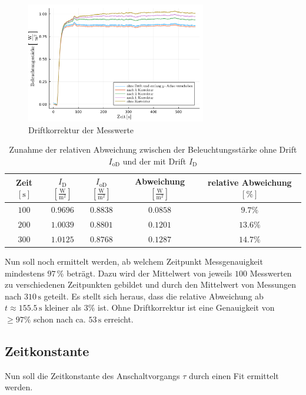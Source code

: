 \documentclass[12pt,a4paper]{scrartcl}
\numberwithin{equation}{section} %
\begin{document}
\begin{figure}[h!]
	\centering
	\includegraphics[width=0.7\textwidth]{../media/B1.1/Drift.pdf}
	\caption{Driftkorrektur der Messwerte}
	\label{abb:Driftkorrektur der Messwerte}
\end{figure}

\begin{table}[h!]
	\centering
	\begin{tabular}{c|c|c|c|c}
		Zeit $[\mathrm{s}]$
		& $I_\mathrm{D}$ $[\mathrm{\frac{W}{m^2}}]$
		& $I_\mathrm{oD}$ $[\mathrm{\frac{W}{m^2}}]$
		& Abweichung $[\mathrm{\frac{W}{m^2}}]$
		& relative Abweichung $[\%]$ \\
		\hline
		$100$ & $0.9696$ & $0.8838$ & $0.0858$ & $9.7\%$\\
		$200$ & $1.0039$ & $0.8801$ & $0.1201$ & $13.6\%$\\
		$300$ & $1.0125$ & $0.8768$ & $0.1287$ & $14.7\%$\\
	\end{tabular}
	\caption{Zunahme der relativen Abweichung zwischen der Beleuchtungsstärke ohne Drift $I_\mathrm{oD}$ und der mit Drift $I_\mathrm{D}$}
	\label{tab:rel Abweichung}
\end{table}

Nun soll noch ermittelt werden, ab welchem Zeitpunkt Messgenauigkeit mindestens $97\,\%$ beträgt. Dazu wird der Mittelwert von jeweils $100$ Messwerten zu verschiedenen Zeitpunkten gebildet und durch den Mittelwert von Messungen nach $310\mathrm{\,s}$ geteilt. Es stellt sich heraus, dass die relative Abweichung ab $t \approx 155.5\mathrm{\,s}$ kleiner als $3\%$ ist. Ohne Driftkorrektur ist eine Genauigkeit von $\geq 97\%$ schon nach ca. $53\mathrm{\,s}$ erreicht.

\subsection{Zeitkonstante}
\label{Zeitkonstante}
Nun soll die Zeitkonstante des Anschaltvorgangs $\tau$ durch einen Fit ermittelt werden.
\end{document}
